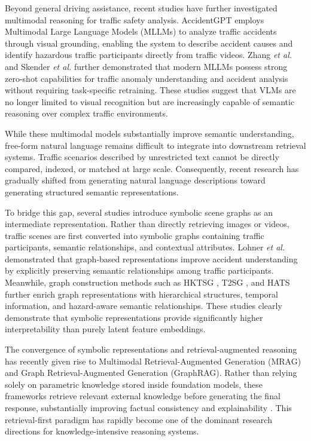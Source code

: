 \documentclass[a4paper, 11pt]{article} %
\begin{document}
Beyond general driving assistance, recent studies have further investigated multimodal reasoning for traffic safety analysis. AccidentGPT \cite{wu2024accidentgpt} employs Multimodal Large Language Models (MLLMs) to analyze traffic accidents through visual grounding, enabling the system to describe accident causes and identify hazardous traffic participants directly from traffic videos. Zhang \textit{et al.} \cite{zhang2025when} and Skender \textit{et al.} \cite{skender2025investigating} further demonstrated that modern MLLMs possess strong zero-shot capabilities for traffic anomaly understanding and accident analysis without requiring task-specific retraining. These studies suggest that VLMs are no longer limited to visual recognition but are increasingly capable of semantic reasoning over complex traffic environments.

While these multimodal models substantially improve semantic understanding, free-form natural language remains difficult to integrate into downstream retrieval systems. Traffic scenarios described by unrestricted text cannot be directly compared, indexed, or matched at large scale. Consequently, recent research has gradually shifted from generating natural language descriptions toward generating structured semantic representations.

To bridge this gap, several studies introduce symbolic scene graphs as an intermediate representation. Rather than directly retrieving images or videos, traffic scenes are first converted into symbolic graphs containing traffic participants, semantic relationships, and contextual attributes. Lohner \textit{et al.} \cite{lohner2024enhancing} demonstrated that graph-based representations improve accident understanding by explicitly preserving semantic relationships among traffic participants. Meanwhile, graph construction methods such as HKTSG \cite{zhou2024hktsg}, T2SG \cite{lv2024t2sg}, and HATS \cite{huang2024hazard} further enrich graph representations with hierarchical structures, temporal information, and hazard-aware semantic relationships. These studies clearly demonstrate that symbolic representations provide significantly higher interpretability than purely latent feature embeddings.

The convergence of symbolic representations and retrieval-augmented reasoning has recently given rise to Multimodal Retrieval-Augmented Generation (MRAG) and Graph Retrieval-Augmented Generation (GraphRAG). Rather than relying solely on parametric knowledge stored inside foundation models, these frameworks retrieve relevant external knowledge before generating the final response, substantially improving factual consistency and explainability \cite{mei2025mrag,tan2025paths,song2025plan}. This retrieval-first paradigm has rapidly become one of the dominant research directions for knowledge-intensive reasoning systems.
\end{document}

